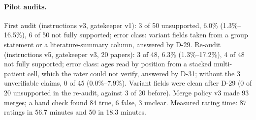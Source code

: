 \documentclass{article} %
\begin{document}
\paragraph{Pilot audits.} First audit (instructions v3, gatekeeper v1): 3 of 50 unsupported, 6.0\% (1.3\%--16.5\%), 6 of 50 not fully supported; error class: variant fields taken from a group statement or a literature-summary column, answered by D-29. Re-audit (instructions v5, gatekeeper v3, 20 papers): 3 of 48, 6.3\% (1.3\%--17.2\%), 4 of 48 not fully supported; error class: ages read by position from a stacked multi-patient cell, which the rater could not verify, answered by D-31; without the 3 unverifiable claims, 0 of 45 (0.0\%--7.9\%). Variant fields were clean after D-29 (0 of 20 unsupported in the re-audit, against 3 of 20 before). Merge policy v3 made 93 merges; a hand check found 84 true, 6 false, 3 unclear. Measured rating time: 87 ratings in 56.7 minutes and 50 in 18.3 minutes.
\end{document}
